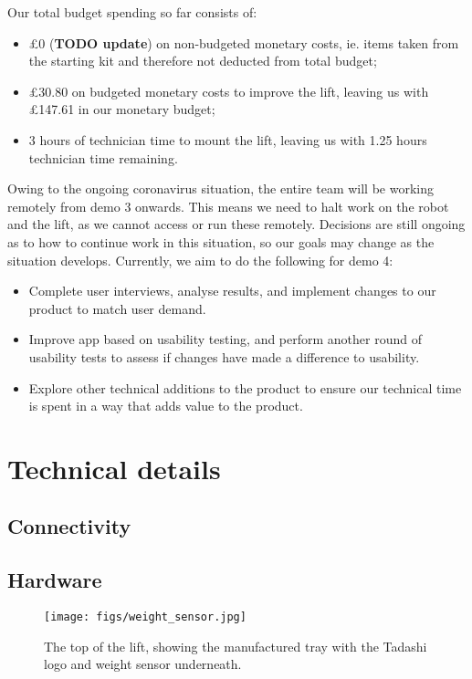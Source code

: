 \documentclass{article}
\begin{document}
Our total budget spending so far consists of:
\begin{itemize}
  \item \pounds 0 ({\bf TODO update}) on non-budgeted monetary costs, ie. items taken from the starting kit and therefore not deducted from total budget;
  \item \pounds 30.80 on budgeted monetary costs to improve the lift, leaving us with \pounds 147.61 in our monetary budget; 
  \item 3 hours of technician time to mount the lift, leaving us with 1.25 hours technician time remaining. 
\end{itemize}

Owing to the ongoing coronavirus situation, the entire team will be working remotely from demo 3 onwards. This means we need to halt work on the robot and the lift, as we cannot access or run these remotely. Decisions are still ongoing as to how to continue work in this situation, so our goals may change as the situation develops. Currently, we aim to do the following for demo 4:
\begin{itemize}
  \item Complete user interviews, analyse results, and implement changes to our product to match user demand.
  \item Improve app based on usability testing, and perform another round of usability tests to assess if changes have made a difference to usability. 
  \item Explore other technical additions to the product to ensure our technical time is spent in a way that adds value to the product. 
\end{itemize}

\section{Technical details}
\subsection{Connectivity}

\subsection{Hardware}
\begin{figure}
  \begin{center}
    \texttt{[image: figs/weight\_sensor.jpg]}
    \caption{The top of the lift, showing the manufactured tray with the Tadashi logo and weight sensor underneath.}
  \label{fig:sensor}
  \end{center}
\end{figure}
\end{document}
